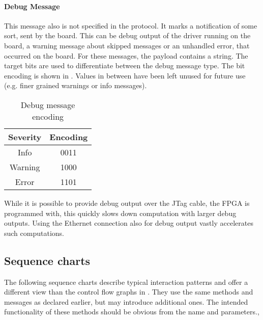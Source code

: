 \documentclass{report}
\begin{document}
\paragraph{Debug Message}
This message also is not specified in the protocol. It marks a notification of some sort, sent by the board. This can be debug output of the driver running on the board, a warning message about skipped messages or an unhandled error, that occurred on the board. For these messages, the payload contains a string.
The target bits are used to differentiate between the debug message type. The bit encoding is shown in . Values in between have been left unused for future use (e.g. finer grained warnings or info messages).

\begin{table}[h]
\centering
\begin{tabular}{ c | c } 
Severity & Encoding \\ \hline
Info & 0011 \\
Warning & 1000 \\
Error &  1101 \\
 \end{tabular}
\caption{Debug message encoding}
\label{tab:protoDebug}
\end{table}

While it is possible to provide debug output over the JTag cable, the FPGA is programmed with, this quickly slows down computation with larger debug outputs. Using the Ethernet connection also for debug output vastly accelerates such computations.

\subsection{Sequence charts}
\label{sec:protocol:sequence}

The following sequence charts describe typical interaction patterns and offer a different view than the control flow graphs in . They use the same methods and messages as declared earlier, but may introduce additional ones. The intended functionality of these methods should be obvious from the name and parameters.,
\end{document}
